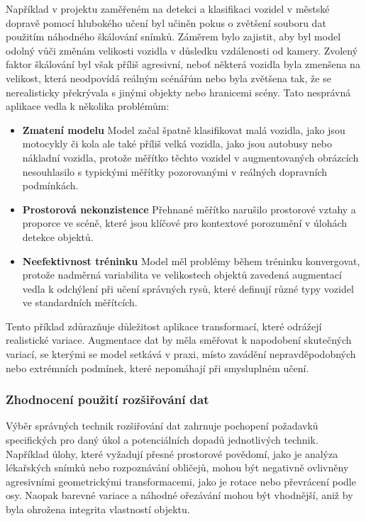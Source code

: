 \documentclass[male,czech,api_ing]{thesis}
\begin{document}
Například v projektu zaměřeném na detekci a klasifikaci vozidel v městské dopravě pomocí hlubokého učení byl učiněn pokus o zvětšení souboru dat použitím náhodného škálování snímků. Záměrem bylo zajistit, aby byl model odolný vůči změnám velikosti vozidla v důsledku vzdálenosti od kamery. Zvolený faktor škálování byl však příliš agresivní, neboť některá vozidla byla zmenšena na velikost, která neodpovídá reálným scénářům nebo byla zvětšena tak, že se nerealisticky překrývala s jinými objekty nebo hranicemi scény. Tato nesprávná aplikace vedla k několika problémům:

\begin{itemize}
    \item \textbf{Zmatení modelu} Model začal špatně klasifikovat malá vozidla, jako jsou motocykly či kola ale také příliš velká vozidla, jako jsou autobusy nebo nákladní vozidla, protože měřítko těchto vozidel v augmentovaných obrázcích nesouhlasilo s typickými měřítky pozorovanými v reálných dopravních podmínkách. 
    \item \textbf{Prostorová nekonzistence} Přehnané měřítko narušilo prostorové vztahy a proporce ve scéně, které jsou klíčové pro kontextové porozumění v úlohách detekce objektů.
    \item \textbf{Neefektivnost tréninku} Model měl problémy během tréninku konvergovat, protože nadměrná variabilita ve velikostech objektů zavedená augmentací vedla k odchýlení při učení správných rysů, které definují různé typy vozidel ve standardních měřítcích. 
\end{itemize}

Tento příklad zdůrazňuje důležitost aplikace transformací, které odrážejí realistické variace. Augmentace dat by měla směřovat k napodobení skutečných variací, se kterými se model setkává v praxi, místo zavádění nepravděpodobných nebo extrémních podmínek, které nepomáhají při smysluplném učení. \cite{AugmentationBasics, AugmentationSurvey}

\subsubsection{Zhodnocení použití rozšiřování dat}
Výběr správných technik rozšiřování dat zahrnuje pochopení požadavků specifických pro daný úkol a potenciálních dopadů jednotlivých technik. Například úlohy, které vyžadují přesné prostorové povědomí, jako je analýza lékařských snímků nebo rozpoznávání obličejů, mohou být negativně ovlivněny agresivními geometrickými transformacemi, jako je rotace nebo převrácení podle osy. Naopak barevné variace a náhodné ořezávání mohou být vhodnější, aniž by byla ohrožena integrita vlastností objektu.
\end{document}
